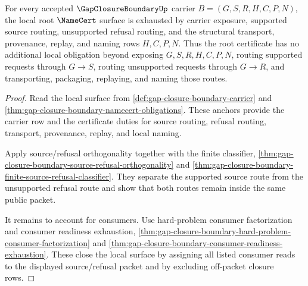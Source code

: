 \begin{theorem}
\label{thm:gap-closure-boundary-root-refusal-namecert-exhaustion}
For every accepted $\GapClosureBoundaryUp$ carrier $B=(G,S,R,H,C,P,N)$, the local root $\NameCert$ surface is exhausted by carrier exposure, supported source routing, unsupported refusal routing, and the structural transport, provenance, replay, and naming rows $H,C,P,N$. Thus the root certificate has no additional local obligation beyond exposing $G,S,R,H,C,P,N$, routing supported requests through $G \longrightarrow S$, routing unsupported requests through $G \longrightarrow R$, and transporting, packaging, replaying, and naming those routes.
\end{theorem}
\begin{proof}
Read the local surface from \autoref{def:gap-closure-boundary-carrier} and \autoref{thm:gap-closure-boundary-namecert-obligations}. These anchors provide the carrier row and the certificate duties for source routing, refusal routing, transport, provenance, replay, and local naming.

Apply source/refusal orthogonality together with the finite classifier, \autoref{thm:gap-closure-boundary-source-refusal-orthogonality} and \autoref{thm:gap-closure-boundary-finite-source-refusal-classifier}. They separate the supported source route from the unsupported refusal route and show that both routes remain inside the same public packet.

It remains to account for consumers. Use hard-problem consumer factorization and consumer readiness exhaustion, \autoref{thm:gap-closure-boundary-hard-problem-consumer-factorization} and \autoref{thm:gap-closure-boundary-consumer-readiness-exhaustion}. These close the local surface by assigning all listed consumer reads to the displayed source/refusal packet and by excluding off-packet closure rows.
\end{proof}
